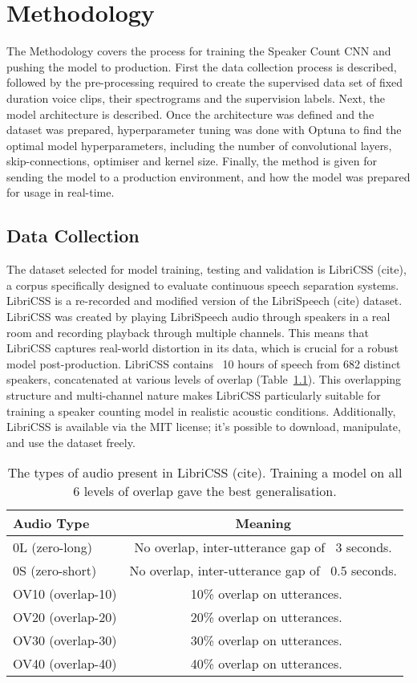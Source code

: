 
\chapter{Methodology}
The Methodology covers the process for training the Speaker Count CNN and pushing the model to production. First the data collection process is described, followed by the pre-processing required to create the supervised data set of fixed duration voice clips, their spectrograms and the supervision labels. Next, the model architecture is described. Once the architecture was defined and the dataset was prepared, hyperparameter tuning was done with Optuna to find the optimal model hyperparameters, including the number of convolutional layers, skip-connections, optimiser and kernel size. Finally, the method is given for sending the model to a production environment, and how the model was prepared for usage in real-time.

\section{Data Collection}
The dataset selected for model training, testing and validation is LibriCSS (cite), a corpus specifically designed to evaluate continuous speech separation systems. LibriCSS is a re-recorded and modified version of the LibriSpeech (cite) dataset. LibriCSS was created by playing LibriSpeech audio through speakers in a real room and recording playback through multiple channels. This means that LibriCSS captures real-world distortion in its data, which is crucial for a robust model post-production. LibriCSS contains ~10 hours of speech from 682 distinct speakers, concatenated at various levels of overlap (Table~\ref{tab:LibriCSS}). This overlapping structure and multi-channel nature makes LibriCSS particularly suitable for training a speaker counting model in realistic acoustic conditions. Additionally, LibriCSS is available via the MIT license; it's possible to download, manipulate, and use the dataset freely.

\begin{table}[H]
  \centering
  \caption{The types of audio present in LibriCSS (cite). Training a model on all 6 levels of overlap gave the best generalisation.}
  \label{tab:LibriCSS}
  \begin{tabular}{|l|c|}
    \hline
    \textbf{Audio Type} & \textbf{Meaning} \\
    \hline
    0L (zero-long) & No overlap, inter-utterance gap of ~3 seconds. \\
    \hline
    0S (zero-short) & No overlap, inter-utterance gap of ~0.5 seconds. \\
    \hline
    OV10 (overlap-10) & ~10\% overlap on utterances. \\
    \hline
    OV20 (overlap-20) & ~20\% overlap on utterances. \\
    \hline
    OV30 (overlap-30) & ~30\% overlap on utterances. \\
    \hline
    OV40 (overlap-40) & ~40\% overlap on utterances. \\
    \hline
  \end{tabular}
\end{table}

